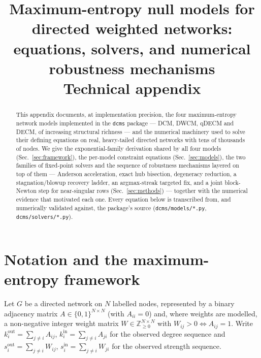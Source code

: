 \documentclass[10pt]{article}
\title{\large \textbf{Maximum-entropy null models for directed weighted networks:\\
equations, solvers, and numerical robustness mechanisms}\\[4pt]
\normalsize Technical appendix}
\author{}
\date{}
\newcommand{\Z}{\mathbb{Z}}
\begin{document}
\maketitle
\vspace{-2.2em}

\begin{abstract}
\noindent
This appendix documents, at implementation precision, the four maximum-entropy
network models implemented in the \texttt{dcms} package --- DCM, DWCM, qDECM
and DECM, of increasing structural richness --- and the numerical machinery
used to solve their defining equations on real, heavy-tailed directed
networks with tens of thousands of nodes. We give the exponential-family
derivation shared by all four models (Sec.~\ref{sec:framework}), the
per-model constraint equations (Sec.~\ref{sec:models}), the two families of
fixed-point solvers and the sequence of robustness mechanisms layered on top
of them --- Anderson acceleration, exact hub bisection, degeneracy reduction,
a stagnation/blowup recovery ladder, an argmax-streak targeted fix, and a
joint block-Newton step for near-singular rows (Sec.~\ref{sec:methods}) ---
together with the numerical evidence that motivated each one. Every equation
below is transcribed from, and numerically validated against, the package's
source (\texttt{dcms/models/*.py}, \texttt{dcms/solvers/*.py}).
\end{abstract}

\section{Notation and the maximum-entropy framework}
\label{sec:framework}

Let $G$ be a directed network on $N$ labelled nodes, represented by a binary
adjacency matrix $A \in \{0,1\}^{N\times N}$ (with $A_{ii}=0$) and, where
weights are modelled, a non-negative integer weight matrix
$W \in \Z_{\ge 0}^{N\times N}$ with $W_{ij}>0 \iff A_{ij}=1$. Write
$k^{\mathrm{out}}_i = \sum_{j\ne i} A_{ij}$, $k^{\mathrm{in}}_i = \sum_{j\ne
i} A_{ji}$ for the observed degree sequence and $s^{\mathrm{out}}_i =
\sum_{j\ne i} W_{ij}$, $s^{\mathrm{in}}_i = \sum_{j\ne i} W_{ji}$ for the
observed strength sequence.
\end{document}
